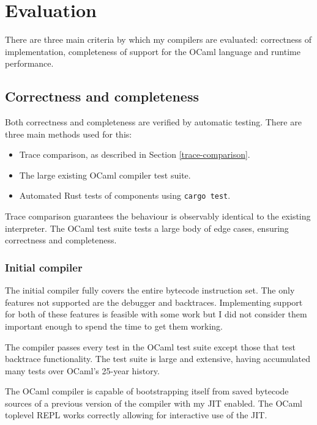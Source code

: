 \chapter{Evaluation}

There are three main criteria by which my compilers are evaluated: correctness of implementation,
completeness of support for the OCaml language and runtime performance.

\section{Correctness and completeness}

Both correctness and completeness are verified by automatic testing. There are three main methods
used for this:

\begin{itemize}
      \item Trace comparison, as described in Section \ref{trace-comparison}.
      \item The large existing OCaml compiler test suite.
      \item Automated Rust tests of components using \texttt{cargo test}.
\end{itemize}

Trace comparison guarantees the behaviour is observably identical to the existing interpreter. The
OCaml test suite tests a large body of edge cases, ensuring correctness and completeness.

\subsection{Initial compiler}

The initial compiler fully covers the entire bytecode instruction set. The only features not
supported are the debugger and backtraces. Implementing support for both of these features is
feasible with some work but I did not consider them important enough to spend the time to get them
working.

The compiler passes every test in the OCaml test suite except those that test backtrace
functionality. The test suite is large and extensive, having accumulated many tests over OCaml's
25-year history.

The OCaml compiler is capable of bootstrapping itself from saved bytecode sources
of a previous version of the compiler with my JIT enabled. The OCaml toplevel REPL works
correctly allowing for interactive use of the JIT.

